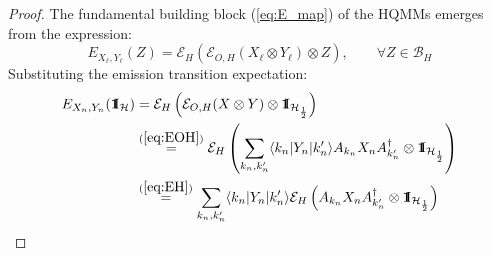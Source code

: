 \documentclass[12pt,a4paper]{article}
\def\id{{\bf 1}\!\!{\rm I}}
\begin{document}
\begin{proof}%
 The fundamental building block (\ref{eq:E_map})  of the HQMMs   emerges from the  expression:
\[
E_{X_{\ell}, Y_{\ell}}(Z) = \mathcal{E}_{H}(\mathcal{E}_{O,H}(X_\ell \otimes Y_\ell) \otimes Z)
, \qquad \forall Z\in \mathcal{B}_H
\]
Substituting the emission transition expectation:
\begin{align*}
E_{X_n,Y_n}(\id_{\mathcal{H}}) &= \mathcal{E}_H \left( \mathcal{E}_{O,H}(X \otimes Y) \otimes \id_{\mathcal{H}_{\frac{1}{2}}} \right) \\
&\overset{(\ref{eq:EOH})}{=} \mathcal{E}_H \left( \sum_{k_n,k_n'} \langle k_n | Y_n | k_n' \rangle A_{k_n} X_n A_{k'_n}^\dagger \otimes \id_{\mathcal{H}_{\frac{1}{2}}} \right) \\
&\overset{(\ref{eq:EH})}{=} \sum_{k_n,k'_n} \langle k_n | Y_n | k'_n \rangle \mathcal{E}_H \left( A_{k_n} X_n A_{k'_n}^\dagger \otimes \id_{\mathcal{H}_{\frac{1}{2}}} \right)
\end{align*}


\end{proof}
\end{document}
